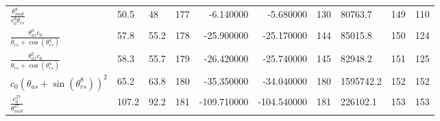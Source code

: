 \begin{tabularx}{\textwidth}{lllrrrrlrr}
$ \displaystyle\frac{\theta_{mid}^{9}}{c_{0}^{9} \theta_{rs}} $  &  50.5  &  48\phantom{.0}  &  177  &  -6.140000  &  -5.680000  &  130  &  80763.7  &  149\phantom{.000000}  &  110\phantom{.000000}  \\ 
$ \displaystyle\frac{\theta_{as}^{3} c_{0}}{\theta_{rs} + \cos{\left(\theta_{rs}^{4} \right)}} $  &  57.8  &  55.2  &  178  &  -25.900000  &  -25.170000  &  144  &  85015.8  &  150\phantom{.000000}  &  124\phantom{.000000}  \\ 
$ \displaystyle\frac{\theta_{as}^{2} c_{0}}{\theta_{rs} + \cos{\left(\theta_{rs}^{4} \right)}} $  &  58.3  &  55.7  &  179  &  -26.420000  &  -25.740000  &  145  &  82948.2  &  151\phantom{.000000}  &  125\phantom{.000000}  \\ 
$ c_{0} \left(\theta_{as} + \sin{\left(\theta_{rs}^{8} \right)}\right)^{2} $  &  65.2  &  63.8  &  180  &  -35.350000  &  -34.040000  &  180  &  1595742.2  &  152\phantom{.000000}  &  152\phantom{.000000}  \\ 
$ \displaystyle\frac{c_{0}^{27}}{\theta_{mid}^{27}} $  &  107.2  &  92.2  &  181  &  -109.710000  &  -104.540000  &  181  &  226102.1  &  153\phantom{.000000}  &  153\phantom{.000000}  \\ 
\bottomrule
\end{tabularx}
